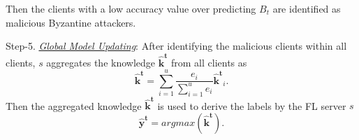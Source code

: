 \documentclass[journal]{IEEEtran}
\begin{document}
Then the clients with a low accuracy value over predicting $B_t$ are identified as malicious Byzantine attackers.
\par Step-5. \ul{\textit{Global Model Updating}}: After identifying the malicious clients within all clients, $s$ aggregates the knowledge $\mathbf{\hat{k}^t}$ from all clients as
\begin{equation}
  \mathbf{\hat{k}^t}=\sum_{i=1}^{u}\frac{e_i}{\sum_{i=1}^{u}e_i}\mathbf{\hat{k}^t}_i.
\end{equation}
Then the aggregated knowledge $\mathbf{\hat{k}^t}$ is used to derive the labels by the FL server $s$
\begin{equation}
  \mathbf{\hat{y}^t}= argmax(\mathbf{\hat{k}^t}).
\end{equation} 
\end{document}
